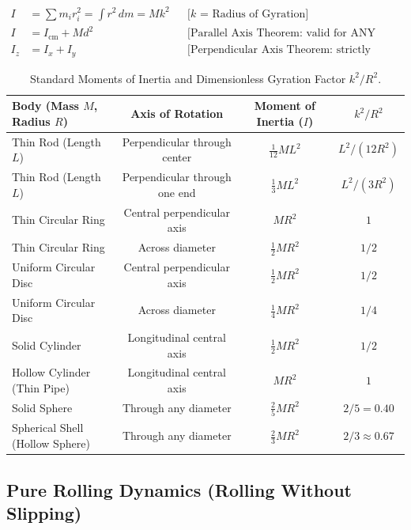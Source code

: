 \documentclass[11pt,a4paper]{article}
\begin{document}
\begin{formulabox}
\begin{align}
  I &= \sum m_i r_i^2 = \int r^2\,dm = M k^2 && \text{[$k$ = Radius of Gyration]} \\
  I &= I_{\text{cm}} + M d^2 && \text{[Parallel Axis Theorem: valid for ANY rigid body]} \\
  I_z &= I_x + I_y && \text{[Perpendicular Axis Theorem: strictly PLANAR laminar bodies only]}
\end{align}
\end{formulabox}

\begin{table}[htbp]
\centering
\small
\renewcommand{\arraystretch}{1.2}
\begin{tabularx}{\textwidth}{L c c c}
\toprule
\textbf{Body (Mass $M$, Radius $R$)} & \textbf{Axis of Rotation} & \textbf{Moment of Inertia ($I$)} & $k^2/R^2$ \\
\midrule
Thin Rod (Length $L$) & Perpendicular through center & $\frac{1}{12} M L^2$ & $L^2 / (12 R^2)$ \\
Thin Rod (Length $L$) & Perpendicular through one end & $\frac{1}{3} M L^2$ & $L^2 / (3 R^2)$ \\
Thin Circular Ring & Central perpendicular axis & $M R^2$ & $1$ \\
Thin Circular Ring & Across diameter & $\frac{1}{2} M R^2$ & $1/2$ \\
Uniform Circular Disc & Central perpendicular axis & $\frac{1}{2} M R^2$ & $1/2$ \\
Uniform Circular Disc & Across diameter & $\frac{1}{4} M R^2$ & $1/4$ \\
Solid Cylinder & Longitudinal central axis & $\frac{1}{2} M R^2$ & $1/2$ \\
Hollow Cylinder (Thin Pipe) & Longitudinal central axis & $M R^2$ & $1$ \\
Solid Sphere & Through any diameter & $\frac{2}{5} M R^2$ & $2/5 = 0.40$ \\
Spherical Shell (Hollow Sphere) & Through any diameter & $\frac{2}{3} M R^2$ & $2/3 \approx 0.67$ \\
\bottomrule
\end{tabularx}
\caption{Standard Moments of Inertia and Dimensionless Gyration Factor $k^2/R^2$.}
\end{table}

\subsection{Pure Rolling Dynamics (Rolling Without Slipping)}
\end{document}
